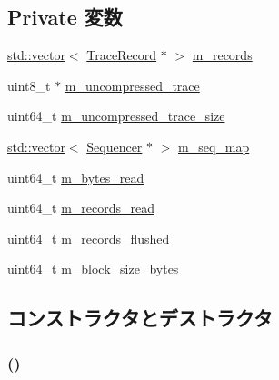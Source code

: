 \subsection*{Private 変数}
\begin{DoxyCompactItemize}
\item 
\hyperlink{classstd_1_1vector}{std::vector}$<$ \hyperlink{classTraceRecord}{TraceRecord} $\ast$ $>$ \hyperlink{classCacheRecorder_adeb49f912155613a3c1d3c309e061ac6}{m\_\-records}
\item 
uint8\_\-t $\ast$ \hyperlink{classCacheRecorder_adc6ca5282f5cfbc266e2474aa9e2482a}{m\_\-uncompressed\_\-trace}
\item 
uint64\_\-t \hyperlink{classCacheRecorder_abcd8159fa39387a7fd790671b1d289c0}{m\_\-uncompressed\_\-trace\_\-size}
\item 
\hyperlink{classstd_1_1vector}{std::vector}$<$ \hyperlink{classSequencer}{Sequencer} $\ast$ $>$ \hyperlink{classCacheRecorder_aa0248d60005113d99eafe0872de03d10}{m\_\-seq\_\-map}
\item 
uint64\_\-t \hyperlink{classCacheRecorder_af866ec1fe37d03f2d8349e05521514d1}{m\_\-bytes\_\-read}
\item 
uint64\_\-t \hyperlink{classCacheRecorder_a59c4e20378fd85e0437e8a9a5bcf140b}{m\_\-records\_\-read}
\item 
uint64\_\-t \hyperlink{classCacheRecorder_af160e7c9a16e7d4534fd53482f7df86b}{m\_\-records\_\-flushed}
\item 
uint64\_\-t \hyperlink{classCacheRecorder_ab7f8c478cbc01ff7258e74be8b395b4f}{m\_\-block\_\-size\_\-bytes}
\end{DoxyCompactItemize}


\subsection{コンストラクタとデストラクタ}
\hypertarget{classCacheRecorder_aa673c9e5d414051444f039a905c2ae23}{
\subsubsection[{CacheRecorder}]{ ()}}
\label{classCacheRecorder_aa673c9e5d414051444f039a905c2ae23}



